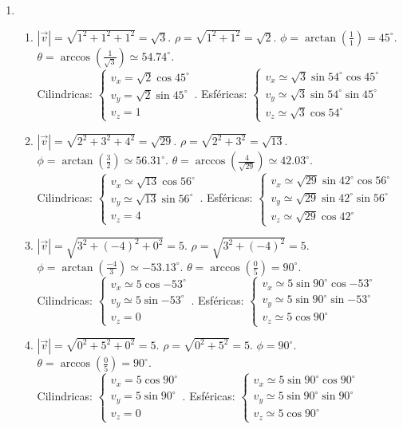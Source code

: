 \documentclass[a4paper]{article}
\newcommand{\exercise}{\item}
\newcommand{\SEL}[1]{ \left\{\begin{matrix} #1 \end{matrix}\right. }
\newcommand{\df}[2]{\displaystyle\frac{#1}{#2}}
\newcommand{\degs}{^{\circ}}
\begin{document}
\begin{enumerate}
\begin{enumerate} [label=(\alph*)]
\end{enumerate}\exercise\begin{enumerate} [label=(\alph*)]		\item $|\vec{v}| = \sqrt{1^2+1^2+1^2} = \sqrt{3}$. $\rho = \sqrt{1^2+1^2} = \sqrt{2}$. $\phi = \arctan\left(\df{1}{1}\right) = 45\degs$. $\theta = \arccos\left(\df{1}{\sqrt{3}}\right) \simeq 54.74\degs$. \\ Cilindricas: $\SEL{v_x=\sqrt{2} \cos{45\degs} \\ v_y=\sqrt{2} \sin{45\degs} \\ v_z=1 }$. Esféricas: $\SEL{v_x \simeq \sqrt{3} \sin{54\degs} \cos{45\degs} \\ v_y \simeq \sqrt{3} \sin{54\degs} \sin{45\degs} \\ v_z \simeq \sqrt{3} \cos{54\degs} }$ 
		\item $|\vec{v}| = \sqrt{2^2+3^2+4^2} = \sqrt{29}$. $\rho = \sqrt{2^2+3^2} = \sqrt{13}$. $\phi = \arctan\left(\df{3}{2}\right) \simeq 56.31\degs$. $\theta = \arccos\left(\df{4}{\sqrt{29}}\right) \simeq 42.03\degs$. \\ Cilindricas: $\SEL{v_x \simeq \sqrt{13} \cos{56\degs} \\ v_y \simeq \sqrt{13} \sin{56\degs} \\ v_z=4 }$. Esféricas: $\SEL{v_x \simeq \sqrt{29} \sin{42\degs} \cos{56\degs} \\ v_y \simeq \sqrt{29} \sin{42\degs} \sin{56\degs} \\ v_z \simeq \sqrt{29} \cos{42\degs} }$
		\item $|\vec{v}| = \sqrt{3^2+(-4)^2+0^2} = 5$. $\rho = \sqrt{3^2+(-4)^2} = 5$. $\phi = \arctan\left(\df{-4}{3}\right) \simeq -53.13\degs$. $\theta = \arccos\left(\df{0}{5}\right) = 90\degs$. \\ Cilindricas: $\SEL{v_x \simeq 5 \cos{-53\degs} \\ v_y \simeq 5 \sin{-53\degs} \\ v_z=0 }$. Esféricas: $\SEL{v_x \simeq 5 \sin{90\degs} \cos{-53\degs} \\ v_y \simeq 5 \sin{90\degs} \sin{-53\degs} \\ v_z \simeq 5 \cos{90\degs} }$
		\item $|\vec{v}| = \sqrt{0^2+5^2+0^2} = 5$. $\rho = \sqrt{0^2+5^2} = 5$. $\phi = 90\degs$. $\theta = \arccos\left(\df{0}{5}\right) = 90\degs$. \\ Cilindricas: $\SEL{v_x=5 \cos{90\degs} \\ v_y=5 \sin{90\degs} \\ v_z=0 }$. Esféricas: $\SEL{v_x \simeq 5 \sin{90\degs} \cos{90\degs} \\ v_y \simeq 5 \sin{90\degs} \sin{90\degs} \\ v_z \simeq 5 \cos{90\degs} }$

\end{enumerate}
\end{enumerate}
\end{document}
